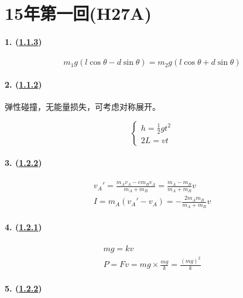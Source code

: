 
\section{15年第一回(H27A)}

\paragraph{1. (\hyperref[subsec:1.1.3]{1.1.3})}

\begin{equation*}
    m_1g(l\cos\theta-d\sin\theta)=m_2g(l\cos\theta+d\sin\theta)
\end{equation*}

\paragraph{2. (\hyperref[subsec:1.1.2]{1.1.2})} 弹性碰撞，无能量损失，可考虑对称展开。

\begin{equation*}
    \begin{cases}
        h=\frac12gt^2\\
        2L=vt
    \end{cases}
\end{equation*}

\paragraph{3. (\hyperref[subsec:1.2.2]{1.2.2})}

\begin{gather*}
    v_A'=\frac{m_Av_A-em_Bv_A}{m_A+m_B}=\frac{m_A-m_B}{m_A+m_B}v\\
    I=m_A(v_A'-v_A)=-\frac{2m_Am_B}{m_A+m_B}v
\end{gather*}

\paragraph{4. (\hyperref[subsec:1.2.1]{1.2.1})}

\begin{gather*}
    mg=kv\\
    P=Fv=mg\times\frac{mg}{k}=\frac{(mg)^2}{k}
\end{gather*}

\paragraph{5. (\hyperref[subsec:1.2.2]{1.2.2})}

